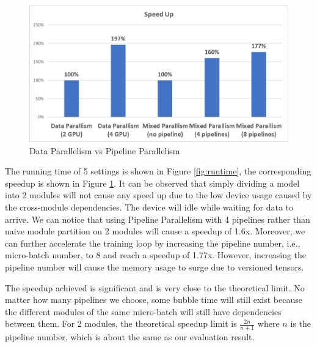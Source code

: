 \documentclass[sigplan, nonacm]{acmart}\settopmatter{printfolios=true,printccs=false,printacmref=false}
\begin{document}
\begin{figure}[htbp]
  \centering
  \includegraphics[scale=0.5]{pipelineparallelspeedup.png}
  \caption{Data Parallelism vs Pipeline Parallelism}
  \label{fig:speedup}
\end{figure}
The running time of 5 settings is shown in Figure \ref{fig:runtime}, the corresponding speedup is shown in Figure \ref{fig:speedup}. It can be observed that simply dividing a model into 2 modules will not cause any speed up due to the low device usage caused by the cross-module dependencies. The device will idle while waiting for data to arrive. We can notice that using Pipeline Parallelism with 4 pipelines rather than naive module partition on 2 modules will cause a speedup of 1.6x. Moreover, we can further accelerate the training loop by increasing the pipeline number, i.e., micro-batch number, to 8 and reach a speedup of 1.77x. However, increasing the pipeline number will cause the memory usage to surge due to versioned tensors.\par
The speedup achieved is significant and is very close to the theoretical limit. No matter how many pipelines we choose, some bubble time will still exist because the different modules of the same micro-batch will still have dependencies between them. For 2 modules, the theoretical speedup limit is $\frac{2n}{n+1}$ where $n$ is the pipeline number, which is about the same as our evaluation result.\par
\end{document}
